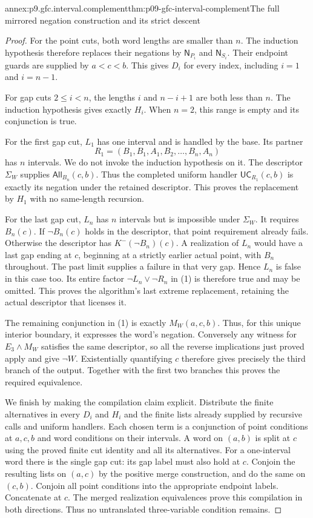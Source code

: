 \begin{annexitem}{annex:p9.gfc.interval.complement}{thm:p09-gfc-interval-complement}{The full mirrored negation construction and its strict descent}
\begin{proof}
For the point cuts,
both word lengths
are smaller than
\(n\). The induction
hypothesis therefore
replaces their
negations by
\(\mathsf N_{P_i}\)
and \(\mathsf N_{S_i}\).
Their endpoint
guards are supplied
by \(a<c<b\).
This gives \(D_i\)
for every index,
including \(i=1\)
and \(i=n-1\).

For gap cuts
\(2\leq i<n\),
the lengths
\(i\) and
\(n-i+1\)
are both less
than \(n\).
The induction
hypothesis gives
exactly \(H_i\).
When \(n=2\),
this range is
empty and its
conjunction is
true.

For the first
gap cut, \(L_1\)
has one interval
and is handled
by the base.
Its partner
\[
             R_1=(B_1,B_1,A_1,B_2,\ldots,B_n,A_n)
\]
has \(n\)
intervals. We
do not invoke
the induction
hypothesis on it.
The descriptor
\(\Sigma_W\)
supplies
\(\mathsf{All}_{B_n}(c,b)\).
Thus the completed
uniform handler
\(\mathsf{UC}_{R_1}(c,b)\)
is exactly
its negation
under the
retained descriptor.
This proves
the replacement
by \(H_1\)
with no
same-length
recursion.

For the last
gap cut, \(L_n\)
has \(n\)
intervals but
is impossible
under \(\Sigma_W\).
It requires
\(B_n(c)\).
If \(\neg B_n(c)\)
holds in the
descriptor, that
point requirement
already fails.
Otherwise the
descriptor has
\(K^-(\neg B_n)(c)\).
A realization
of \(L_n\)
would have
a last gap
ending at
\(c\), beginning
at a strictly
earlier actual
point, with
\(B_n\)
throughout.
The past limit
supplies a
failure in
that very
gap. Hence
\(L_n\)
is false
in this
case too.
Its entire
factor
\(\neg L_n\lor\neg R_n\)
in (1) is
therefore true
and may be
omitted.
This proves
the algorithm's
last extreme
replacement,
retaining the
actual descriptor
that licenses it.

The remaining
conjunction in
(1) is exactly
\(M_W(a,c,b)\).
Thus, for this
unique interior
boundary, it
expresses the
word's negation.
Conversely any
witness for
\(E_3\land M_W\)
satisfies the
same descriptor,
so all the
reverse implications
just proved
apply and
give \(\neg W\).
Existentially
quantifying \(c\)
therefore gives
precisely the
third branch
of the output.
Together with
the first two
branches this
proves the
required
equivalence.

We finish by
making the
compilation
claim explicit.
Distribute the
finite alternatives
in every \(D_i\)
and \(H_i\)
and the
finite lists
already supplied
by recursive
calls and
uniform handlers.
Each chosen
term is a
conjunction
of point
conditions at
\(a,c,b\)
and word
conditions on
their intervals.
A word on
\((a,b)\)
is split
at \(c\)
using the
proved finite
cut identity
and all
its alternatives.
For a
one-interval
word there
is the
single gap
cut: its
gap label
must also
hold at
\(c\).
Conjoin
the resulting
lists on
\((a,c)\)
by the
positive merge
construction,
and do the
same on
\((c,b)\).
Conjoin all
point conditions
into the
appropriate
endpoint labels.
Concatenate
at \(c\).
The merged
realization
equivalences
prove this
compilation
in both
directions.
Thus no
untranslated
three-variable
condition
remains.


\end{proof}
\end{annexitem}
